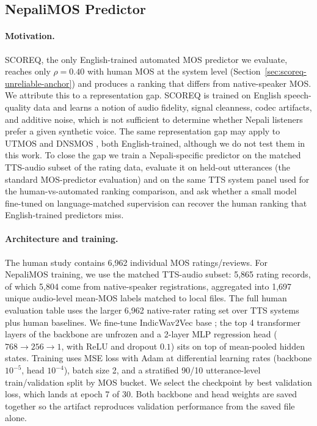 \documentclass[11pt]{article}
\begin{document}
\subsection{NepaliMOS Predictor}
\label{sec:nepalimos}

\paragraph{Motivation.} SCOREQ, the only English-trained automated MOS predictor we evaluate, reaches only $\rho = 0.40$ with human MOS at the system level (Section~\ref{sec:scoreq-unreliable-anchor}) and produces a ranking that differs from native-speaker MOS. We attribute this to a representation gap. SCOREQ is trained on English speech-quality data and learns a notion of audio fidelity, signal cleanness, codec artifacts, and additive noise, which is not sufficient to determine whether Nepali listeners prefer a given synthetic voice. The same representation gap may apply to UTMOS \citep{saeki2022utmos} and DNSMOS \citep{reddy2022dnsmos}, both English-trained, although we do not test them in this work. To close the gap we train a Nepali-specific predictor on the matched TTS-audio subset of the rating data, evaluate it on held-out utterances (the standard MOS-predictor evaluation) and on the same TTS system panel used for the human-vs-automated ranking comparison, and ask whether a small model fine-tuned on language-matched supervision can recover the human ranking that English-trained predictors miss.

\paragraph{Architecture and training.} The human study contains 6{,}962 individual MOS ratings/reviews. For NepaliMOS training, we use the matched TTS-audio subset: 5{,}865 rating records, of which 5{,}804 come from native-speaker registrations, aggregated into 1{,}697 unique audio-level mean-MOS labels matched to local files. The full human evaluation table uses the larger 6{,}962 native-rater rating set over TTS systems plus human baselines. We fine-tune IndicWav2Vec base \citep{javed2022indicwav2vec}; the top 4 transformer layers of the backbone are unfrozen and a 2-layer MLP regression head ($768 \rightarrow 256 \rightarrow 1$, with ReLU and dropout $0.1$) sits on top of mean-pooled hidden states. Training uses MSE loss with Adam at differential learning rates (backbone $10^{-5}$, head $10^{-4}$), batch size 2, and a stratified 90/10 utterance-level train/validation split by MOS bucket. We select the checkpoint by best validation loss, which lands at epoch 7 of 30. Both backbone and head weights are saved together so the artifact reproduces validation performance from the saved file alone.
\end{document}
